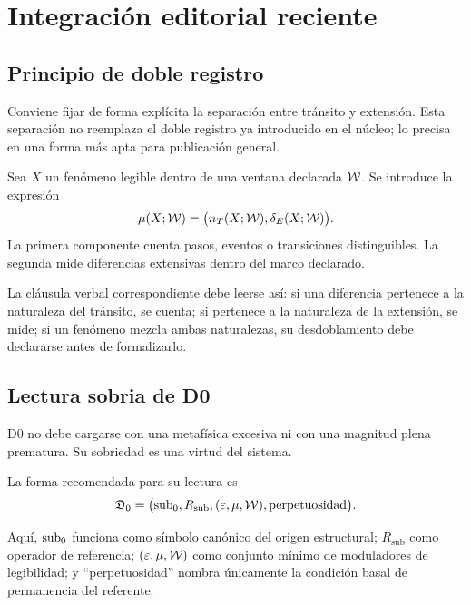 \chapter{Integración editorial reciente}

\section{Principio de doble registro}
\begin{observation}
Conviene fijar de forma explícita la separación entre tránsito y extensión. Esta separación no reemplaza el doble registro ya introducido en el núcleo; lo precisa en una forma más apta para publicación general.
\end{observation}

\begin{definition}
Sea $X$ un fenómeno legible dentro de una ventana declarada $\mathcal W$. Se introduce la expresión
\[
\mu(X;\mathcal W) = \bigl(n_T(X;\mathcal W), \delta_E(X;\mathcal W)\bigr).
\]
La primera componente cuenta pasos, eventos o transiciones distinguibles. La segunda mide diferencias extensivas dentro del marco declarado.
\end{definition}

\begin{observation}
La cláusula verbal correspondiente debe leerse así: si una diferencia pertenece a la naturaleza del tránsito, se cuenta; si pertenece a la naturaleza de la extensión, se mide; si un fenómeno mezcla ambas naturalezas, su desdoblamiento debe declararse antes de formalizarlo.
\end{observation}

\section{Lectura sobria de D0}
\begin{observation}
D0 no debe cargarse con una metafísica excesiva ni con una magnitud plena prematura. Su sobriedad es una virtud del sistema.
\end{observation}

\begin{definition}
La forma recomendada para su lectura es
\[
\mathfrak{D}_0 = \bigl(\mathrm{sub}_{0}, R_{\mathrm{sub}}, (\varepsilon,\mu,\mathcal W), \text{perpetuosidad}\bigr).
\]
\end{definition}

\begin{observation}
Aquí, $\mathrm{sub}_{0}$ funciona como símbolo canónico del origen estructural; $R_{\mathrm{sub}}$ como operador de referencia; $(\varepsilon,\mu,\mathcal W)$ como conjunto mínimo de moduladores de legibilidad; y “perpetuosidad” nombra únicamente la condición basal de permanencia del referente.
\end{observation}


